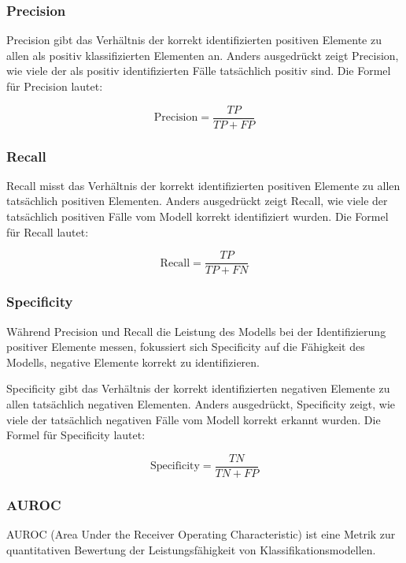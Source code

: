 \subsubsection{Precision} \label{chap:precision}
Precision gibt das Verhältnis der korrekt identifizierten positiven Elemente zu allen als positiv klassifizierten Elementen an. Anders ausgedrückt zeigt Precision, wie viele der als positiv identifizierten Fälle tatsächlich positiv sind. Die Formel für Precision lautet:

\begin{equation}
    \text{Precision} = \frac{TP}{TP + FP}
    \label{eq:PrecisionFormula}
\end{equation}

\subsubsection{Recall} \label{chap:recall}
Recall misst das Verhältnis der korrekt identifizierten positiven Elemente zu allen tatsächlich positiven Elementen. Anders ausgedrückt zeigt Recall, wie viele der tatsächlich positiven Fälle vom Modell korrekt identifiziert wurden. Die Formel für Recall lautet:

\begin{equation}
    \text{Recall} = \frac{TP}{TP + FN}
    \label{eq:RecallFormula}
\end{equation}

\subsubsection{Specificity} \label{chap:specificity}
Während Precision und Recall die Leistung des Modells bei der Identifizierung positiver Elemente messen, fokussiert sich Specificity auf die Fähigkeit des Modells, negative Elemente korrekt zu identifizieren.

Specificity gibt das Verhältnis der korrekt identifizierten negativen Elemente zu allen tatsächlich negativen Elementen. Anders ausgedrückt, Specificity zeigt, wie viele der tatsächlich negativen Fälle vom Modell korrekt erkannt wurden. Die Formel für Specificity lautet:

\begin{equation}
    \text{Specificity} = \frac{TN}{TN + FP}
    \label{eq:SpecificityFormula}
\end{equation}

\subsubsection{AUROC} \label{chap:auroc}
AUROC (Area Under the Receiver Operating Characteristic) ist eine Metrik zur quantitativen Bewertung der Leistungsfähigkeit von Klassifikationsmodellen. 

